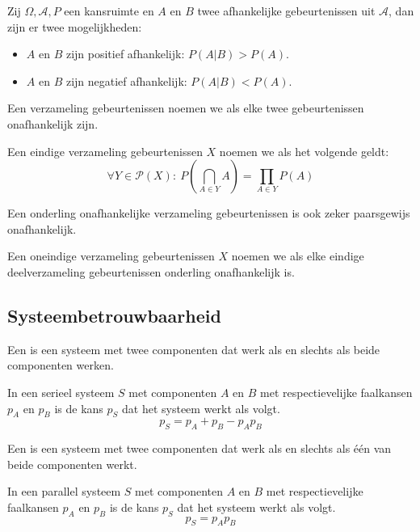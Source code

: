 \documentclass[main.tex]{subfiles}
\begin{document}
\begin{st}
  Zij $\Omega,\mathcal{A},P$ een kansruimte en $A$ en $B$ twee afhankelijke gebeurtenissen uit $\mathcal{A}$, dan zijn er twee mogelijkheden:
  \begin{itemize}
  \item $A$ en $B$ zijn positief afhankelijk: $P(A|B) > P(A)$.
  \item $A$ en $B$ zijn negatief afhankelijk: $P(A|B) < P(A)$.
  \end{itemize}
\end{st}

\begin{de}
  Een verzameling gebeurtenissen noemen we  als elke twee gebeurtenissen onafhankelijk zijn.
\end{de}

\begin{de}
  Een eindige verzameling gebeurtenissen $X$ noemen we  als het volgende geldt:
  \[ \forall Y\in \mathcal{P}(X):\ P\left( \bigcap_{A\in Y}A \right) = \prod_{A\in Y}P(A) \]
\end{de}

\begin{ei}
  Een onderling onafhankelijke verzameling gebeurtenissen is ook zeker paarsgewijs onafhankelijk.
\end{ei}

\begin{de}
  Een oneindige verzameling gebeurtenissen $X$ noemen we  als elke eindige deelverzameling gebeurtenissen onderling onafhankelijk is.
\end{de}

\subsection{Systeembetrouwbaarheid}
\label{sec:syst}


\begin{de}
  Een  is een systeem met twee componenten dat werk als en slechts als beide componenten werken.
\end{de}

\begin{st}
  In een serieel systeem $S$ met componenten $A$ en $B$ met respectievelijke faalkansen $p_{A}$ en $p_{B}$ is de kans $p_{S}$ dat het systeem werkt als volgt.
  \[ p_{S} = p_{A} + p_{B} -p_{A}p_{B} \]
\end{st}

\begin{de}
  Een  is een systeem met twee componenten dat werk als en slechts als \'e\'en van beide componenten werkt.
\end{de}

\begin{st}
  In een parallel systeem $S$ met componenten $A$ en $B$ met respectievelijke faalkansen $p_{A}$ en $p_{B}$ is de kans $p_{S}$ dat het systeem werkt als volgt.
  \[ p_{S} = p_{A}p_{B} \]
\end{st}
\end{document}
